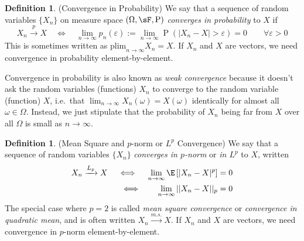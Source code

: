 \documentclass[12pt]{article}
\theoremstyle{plain}
\theoremstyle{definition}
\newtheorem{defn}[thm]{Definition}
\theoremstyle{remark}
\newcommand{\Prb}{\operatorname{P}}
\newcommand{\pto}{\xrightarrow{p}}
\newcommand{\msto}{\xrightarrow{m.s.}}
\newcommand{\Lpto}{\xrightarrow{L_p}}
\newcommand{\plim}{\text{plim}_{n\rightarrow\infty}}
\newcommand{\limn}{\lim_{n\rightarrow\infty}}
\begin{document}
\begin{defn}{(Convergence in Probability)}
We say that a sequence of random variables $\{ X_n \}$ on measure space
$(\Omega,\sF,\Prb)$ \emph{converges in probability} to $X$ if
\begin{equation}
  \label{plim}
  X_n\pto X
  \quad\iff\quad
  \limn p_n(\varepsilon) :=
  \limn
  \Prb(\left\lvert X_n - X \right\rvert > \varepsilon) = 0
  \qquad \forall  \varepsilon> 0
\end{equation}
This is sometimes written as $\plim X_n = X$.
If $X_n$ and $X$ are vectors, we need convergence in probability
element-by-element.

Convergence in probability is also known as \emph{weak convergence}
because it doesn't ask the random variables (functions) $X_n$ to
converge to the random variable (function) $X$, i.e.\ that
$\limn X_n(\omega)=X(\omega)$ identically for almost all
$\omega\in\Omega$.
Instead, we just stipulate that the probability of $X_n$ being far from
$X$ over all $\Omega$ is small as $n\rightarrow\infty$.
\end{defn}

\begin{defn}{(Mean Square and $p$-norm or $L^p$ Convergence)}
We say that a sequence of random variables $\{ X_n \}$
\emph{converges in $p$-norm} or \emph{in $L^p$} to $X$, written
\begin{align*}
  X_n \Lpto X
  \quad\iff\quad
  \limn \E\left[|X_n-X|^p\right] &= 0 \\
  \iff\quad\;\;\;
  \limn ||X_n-X||_p &= 0
\end{align*}
The special case where $p=2$ is called \emph{mean square convergence} or
\emph{convergence in quadratic mean}, and is often written $X_n\msto X$.
If $X_n$ and $X$ are vectors, we need convergence in $p$-norm
element-by-element.
\end{defn}
\end{document}
